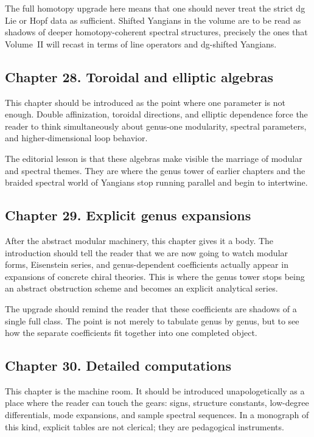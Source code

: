 The full homotopy upgrade here means that one should never treat the strict dg Lie or Hopf data as sufficient.  Shifted Yangians in the volume are to be read as shadows of deeper homotopy-coherent spectral structures, precisely the ones that Volume~II will recast in terms of line operators and dg-shifted Yangians.

\subsection*{Chapter 28. Toroidal and elliptic algebras}
This chapter should be introduced as the point where one parameter is not enough.  Double affinization, toroidal directions, and elliptic dependence force the reader to think simultaneously about genus-one modularity, spectral parameters, and higher-dimensional loop behavior.

The editorial lesson is that these algebras make visible the marriage of modular and spectral themes.  They are where the genus tower of earlier chapters and the braided spectral world of Yangians stop running parallel and begin to intertwine.

\subsection*{Chapter 29. Explicit genus expansions}
After the abstract modular machinery, this chapter gives it a body.  The introduction should tell the reader that we are now going to watch modular forms, Eisenstein series, and genus-dependent coefficients actually appear in expansions of concrete chiral theories.  This is where the genus tower stops being an abstract obstruction scheme and becomes an explicit analytical series.

The upgrade should remind the reader that these coefficients are shadows of a single full class.  The point is not merely to tabulate genus by genus, but to see how the separate coefficients fit together into one completed object.

\subsection*{Chapter 30. Detailed computations}
This chapter is the machine room.  It should be introduced unapologetically as a place where the reader can touch the gears: signs, structure constants, low-degree differentials, mode expansions, and sample spectral sequences.  In a monograph of this kind, explicit tables are not clerical; they are pedagogical instruments.

